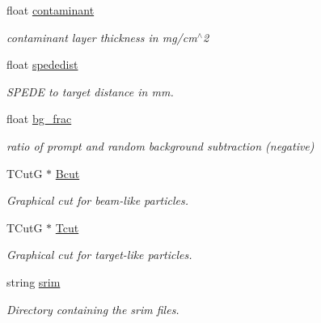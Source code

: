 \begin{DoxyCompactItemize}
float \hyperlink{classg__clx_a9093a10412ab047b3b910e4c4a9d70d1}{contaminant}
\begin{DoxyCompactList}\small\item\em contaminant layer thickness in mg/cm$^\wedge$2 \end{DoxyCompactList}\item 
\mbox{\label{classg__clx_aca4cd80422665dab4188cbf82bb569ce}} 
float \hyperlink{classg__clx_aca4cd80422665dab4188cbf82bb569ce}{spededist}
\begin{DoxyCompactList}\small\item\em S\+P\+E\+DE to target distance in mm. \end{DoxyCompactList}\item 
\mbox{\label{classg__clx_ad9d34b2f15cdb59de8b46f1f68280c5c}} 
float \hyperlink{classg__clx_ad9d34b2f15cdb59de8b46f1f68280c5c}{bg\+\_\+frac}
\begin{DoxyCompactList}\small\item\em ratio of prompt and random background subtraction (negative) \end{DoxyCompactList}\item 
\mbox{\label{classg__clx_a626bb40b10360e2572d0c489a0cde2ad}} 
T\+CutG $\ast$ \hyperlink{classg__clx_a626bb40b10360e2572d0c489a0cde2ad}{Bcut}
\begin{DoxyCompactList}\small\item\em Graphical cut for beam-\/like particles. \end{DoxyCompactList}\item 
\mbox{\label{classg__clx_a5607f06b4881cc2843fd2b9c9c16b35b}} 
T\+CutG $\ast$ \hyperlink{classg__clx_a5607f06b4881cc2843fd2b9c9c16b35b}{Tcut}
\begin{DoxyCompactList}\small\item\em Graphical cut for target-\/like particles. \end{DoxyCompactList}\item 
\mbox{\label{classg__clx_a93a1356b136b6383340a9f5d3ae034f0}} 
string \hyperlink{classg__clx_a93a1356b136b6383340a9f5d3ae034f0}{srim}
\begin{DoxyCompactList}\small\item\em Directory containing the srim files. \end{DoxyCompactList}\item 

\end{DoxyCompactItemize}
